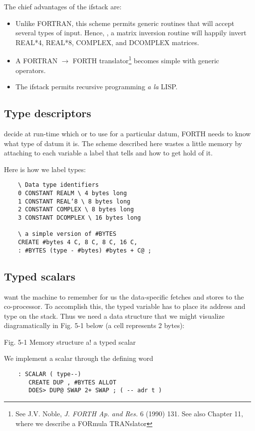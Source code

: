 The chief advantages of the ifstack are:
\begin{itemize}
    \item Unlike FORTRAN, this scheme permits generic routines that will accept several types of input. Hence, \eg, a matrix inversion routine will happily invert REAL*4, REAL*8, COMPLEX, and DCOMPLEX matrices.
    \item A FORTRAN $\rightarrow$ FORTH translator\footnote{See J.V. Noble, \textit{J. FORTH Ap. and Res.} 6 (1990) 131. See also Chapter 11, where we describe a FORmula TRANslator} becomes simple with generic operators.
    \item The ifstack permits recursive programming \textit{a la} LISP.
\end{itemize}

\subsection{Type descriptors}
 decide at run-time which  or \regc{!} to use for a particular datum, FORTH needs to know what type of datum it is. The scheme described here wastes a little memory by attaching to each variable a label that tells  and  how to get hold of it.

Here is how we label types:
\begin{lstlisting}
    \ Data type identifiers
    0 CONSTANT REALM \ 4 bytes long
    1 CONSTANT REAL‘8 \ 8 bytes long
    2 CONSTANT COMPLEX \ 8 bytes long
    3 CONSTANT DCOMPLEX \ 16 bytes long

    \ a simple version of #BYTES
    CREATE #bytes 4 C, 8 C, 8 C, 16 C,
    : #BYTES (type - #bytes) #bytes + C@ ;
\end{lstlisting}

\subsection{Typed scalars}

 want the machine to remember for us the data-specific fetches and stores to the co-processor. To accomplish this, the typed variable has to place its address and type on the stack. Thus we need a data structure that we might visualize diagramatically in Fig. 5-1 below (a cell  represents 2 bytes):

Fig. 5-1 Memory structure a! a typed scalar

We implement a scalar through the defining word

\begin{lstlisting}
    : SCALAR ( type--)
       CREATE DUP , #BYTES ALLOT
       DOES> DUP@ SWAP 2+ SWAP ; ( -- adr t )
\end{lstlisting}

